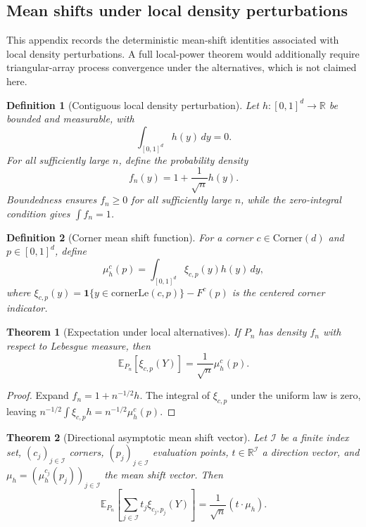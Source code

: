 \documentclass[pdflatex]{sn-jnl}
\theoremstyle{thmstyleone}
\newtheorem{theorem}{Theorem}[section]
\theoremstyle{thmstyletwo}
\theoremstyle{thmstylethree}
\newtheorem{definition}{Definition}[section]
\newcommand{\R}{\mathbb{R}}
\newcommand{\E}{\mathbb{E}}
\begin{document}
\begin{appendices}
\section{Mean shifts under local density perturbations}\label{app:local-power}

This appendix records the deterministic mean-shift identities associated with local density perturbations. A full local-power theorem would additionally require triangular-array process convergence under the alternatives, which is not claimed here.

\begin{definition}[Contiguous local density perturbation]\label{def:local-density}
Let $h:[0,1]^d\to\R$ be bounded and measurable, with
\[
  \int_{[0,1]^d}h(y)\,dy=0.
\]
For all sufficiently large $n$, define the probability density
\[
  f_n(y) = 1 + \frac{1}{\sqrt{n}} h(y).
\]
Boundedness ensures $f_n\ge0$ for all sufficiently large $n$, while the zero-integral condition gives $\int f_n=1$.
\end{definition}

\begin{definition}[Corner mean shift function]\label{def:mean-shift}
For a corner $c\in\mathrm{Corner}(d)$ and $p\in[0,1]^d$, define
\[
  \mu_h^c(p)=\int_{[0,1]^d}\xi_{c,p}(y)h(y)\,dy,
\]
where $\xi_{c,p}(y) = \mathbf 1\{y \in \mathrm{cornerLe}(c,p)\} - F^c(p)$ is the centered corner indicator.
\end{definition}

\begin{theorem}[Expectation under local alternatives]\label{thm:local-alternative-expectation}
If $P_n$ has density $f_n$ with respect to Lebesgue measure, then
\[
  \E_{P_n}[\xi_{c,p}(Y)]
  =\frac{1}{\sqrt n}\mu_h^c(p).
\]
\end{theorem}

\begin{proof}
Expand $f_n=1+n^{-1/2}h$. The integral of $\xi_{c,p}$ under the uniform law is zero, leaving $n^{-1/2}\int\xi_{c,p}h=n^{-1/2}\mu_h^c(p)$.
\end{proof}

\begin{theorem}[Directional asymptotic mean shift vector]\label{thm:local-alternative-mean-shift-vector}
Let $\mathcal I$ be a finite index set, $(c_j)_{j\in\mathcal I}$ corners, $(p_j)_{j\in\mathcal I}$ evaluation points, $t \in \R^\mathcal I$ a direction vector, and $\mu_h = (\mu_h^{c_j}(p_j))_{j\in\mathcal I}$ the mean shift vector. Then
\[
  \E_{P_n}\!\left[\sum_{j\in\mathcal I}t_j\xi_{c_j,p_j}(Y)\right]
  =\frac{1}{\sqrt n}(t\cdot\mu_h).
\]
\end{theorem}


\end{appendices}
\end{document}

